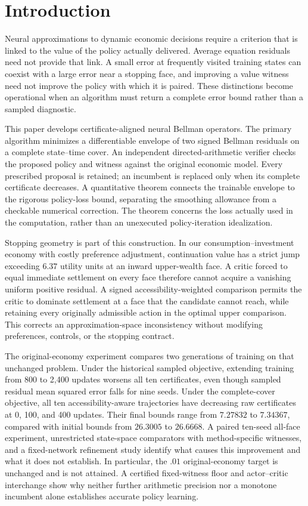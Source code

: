 \section{Introduction}\label{sec:introduction}
Neural approximations to dynamic economic decisions require a criterion that is linked to the value of the policy actually delivered. Average equation residuals need not provide that link. A small error at frequently visited training states can coexist with a large error near a stopping face, and improving a value witness need not improve the policy with which it is paired. These distinctions become operational when an algorithm must return a complete error bound rather than a sampled diagnostic.

This paper develops certificate-aligned neural Bellman operators. The primary algorithm minimizes a differentiable envelope of two signed Bellman residuals on a complete state--time cover. An independent directed-arithmetic verifier checks the proposed policy and witness against the original economic model. Every prescribed proposal is retained; an incumbent is replaced only when its complete certificate decreases. A quantitative theorem connects the trainable envelope to the rigorous policy-loss bound, separating the smoothing allowance from a checkable numerical correction. The theorem concerns the loss actually used in the computation, rather than an unexecuted policy-iteration idealization.

Stopping geometry is part of this construction. In our consumption--investment economy with costly preference adjustment, continuation value has a strict jump exceeding $6.37$ utility units at an inward upper-wealth face. A critic forced to equal immediate settlement on every face therefore cannot acquire a vanishing uniform positive residual. A signed accessibility-weighted comparison permits the critic to dominate settlement at a face that the candidate cannot reach, while retaining every originally admissible action in the optimal upper comparison. This corrects an approximation-space inconsistency without modifying preferences, controls, or the stopping contract.

The original-economy experiment compares two generations of training on that unchanged problem. Under the historical sampled objective, extending training from 800 to 2,400 updates worsens all ten certificates, even though sampled residual mean squared error falls for nine seeds. Under the complete-cover objective, all ten accessibility-aware trajectories have decreasing raw certificates at 0, 100, and 400 updates. Their final bounds range from $7.27832$ to $7.34367$, compared with initial bounds from $26.3005$ to $26.6668$. A paired ten-seed all-face experiment, unrestricted state-space comparators with method-specific witnesses, and a fixed-network refinement study identify what causes this improvement and what it does not establish. In particular, the $.01$ original-economy target is unchanged and is not attained. A certified fixed-witness floor and actor--critic interchange show why neither further arithmetic precision nor a monotone incumbent alone establishes accurate policy learning.

